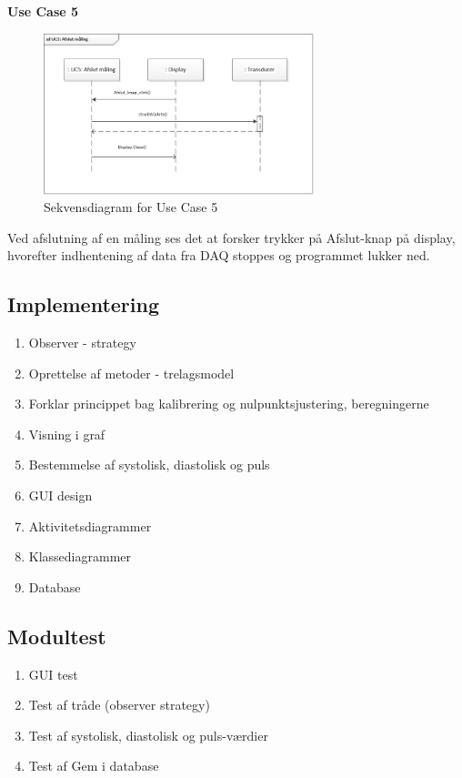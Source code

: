 \textbf{Use Case 5}
\begin{figure}[H]
	\centering
	\includegraphics[width=0.7\textwidth]{Figurer/UC5}
	\caption{Sekvensdiagram for Use Case 5}
\end{figure}
Ved afslutning af en måling ses det at forsker trykker på Afslut-knap på display, hvorefter indhentening af data fra DAQ stoppes og programmet lukker ned.

\subsection{Implementering}
\begin{enumerate}
\item Observer - strategy
\item Oprettelse af metoder - trelagsmodel
\item Forklar princippet bag kalibrering og nulpunktsjustering, beregningerne
\item Visning i graf
\item Bestemmelse af systolisk, diastolisk og puls 
\item GUI design
\item Aktivitetsdiagrammer
\item Klassediagrammer
\item Database
\end{enumerate}

\subsection{Modultest}
\begin{enumerate}
\item GUI test
\item Test af tråde (observer strategy)
\item Test af systolisk, diastolisk og puls-værdier
\item Test af Gem i database
\end{enumerate}